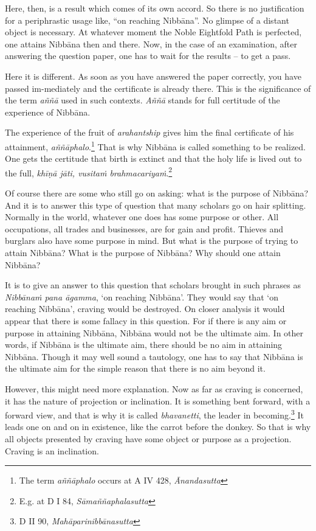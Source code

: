 Here, then, is a result which comes of its own accord. So there is no justification for a periphrastic usage like, ``on reaching Nibbāna''. No glimpse of a distant object is necessary. At whatever moment the Noble Eightfold Path is perfected, one attains Nibbāna then and there. Now, in the case of an examination, after answering the question paper, one has to wait for the results -- to get a pass.

Here it is different. As soon as you have answered the paper correctly, you have passed im-mediately and the certificate is already there. This is the significance of the term \emph{aññā} used in such contexts. \emph{Aññā} stands for full certitude of the experience of Nibbāna.

The experience of the fruit of \emph{arahantship} gives him the final certificate of his attainment, \emph{aññāphalo}.\footnote{The term \emph{aññāphalo} occurs at A IV 428, \emph{Ānandasutta}} That is why Nibbāna is called something to be realized. One gets the certitude that birth is extinct and that the holy life is lived out to the full, \emph{khīṇā jāti, vusitaṁ brahmacariyaṁ}.\footnote{E.g. at D I 84, \emph{Sāmaññaphalasutta}}

Of course there are some who still go on asking: what is the purpose of Nibbāna? And it is to answer this type of question that many scholars go on hair splitting. Normally in the world, whatever one does has some purpose or other. All occupations, all trades and businesses, are for gain and profit. Thieves and burglars also have some purpose in mind. But what is the purpose of trying to attain Nibbāna? What is the purpose of Nibbāna? Why should one attain Nibbāna?

It is to give an answer to this question that scholars brought in such phrases as \emph{Nibbānaṁ pana āgamma}, `on reaching Nibbāna'. They would say that `on reaching Nibbāna', craving would be destroyed. On closer analysis it would appear that there is some fallacy in this question. For if there is any aim or purpose in attaining Nibbāna, Nibbāna would not be the ultimate aim. In other words, if Nibbāna is the ultimate aim, there should be no aim in attaining Nibbāna. Though it may well sound a tautology, one has to say that Nibbāna is the ultimate aim for the simple reason that there is no aim beyond it.

However, this might need more explanation. Now as far as craving is concerned, it has the nature of projection or inclination. It is something bent forward, with a forward view, and that is why it is called \emph{bhavanetti}, the leader in becoming.\footnote{D II 90, \emph{Mahāparinibbānasutta}} It leads one on and on in existence, like the carrot before the donkey. So that is why all objects presented by craving have some object or purpose as a projection. Craving is an inclination.

